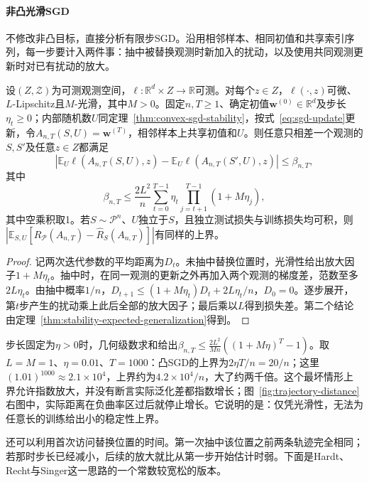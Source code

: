 \paragraph{非凸光滑SGD}

不修改非凸目标，直接分析有限步SGD。沿用相邻样本、相同初值和共享索引序列，每一步要计入两件事：抽中被替换观测时新加入的扰动，以及使用共同观测更新时对已有扰动的放大。

\begin{theorem}[非凸SGD的扰动传播]
\label{thm:nonconvex-sgd-product}
设$(Z,\mathcal Z)$为可测观测空间，$\ell:\mathbb R^d\times Z\to\mathbb R$可测。对每个$z\in Z$，$\ell(\cdot,z)$可微、$L$-Lipschitz且$M$-光滑，其中$M>0$。固定$n,T\geq1$、确定初值$\bm w^{(0)}\in\mathbb R^d$及步长$\eta_t\geq0$；内部随机数$U$同定理~\ref{thm:convex-sgd-stability}，按式~\eqref{eq:sgd-update}更新，令$A_{n,T}(S,U)=\bm w^{(T)}$，相邻样本上共享初值和$U$。则任意只相差一个观测的$S,S'$及任意$z\in Z$都满足
\[
 \left|\mathbb E_U\ell(A_{n,T}(S,U),z)
 -\mathbb E_U\ell(A_{n,T}(S',U),z)\right|\leq\beta_{n,T},
\]
其中
\[
 \beta_{n,T}\leq\frac{2L^2}{n}
 \sum_{t=0}^{T-1}\eta_t\prod_{j=t+1}^{T-1}(1+M\eta_j),
\]
其中空乘积取1。若$S\sim\mathcal P^n$、$U$独立于$S$，且独立测试损失与训练损失均可积，则$|\mathbb E_{S,U}[R_{\mathcal P}(A_{n,T})-\hat R_S(A_{n,T})]|$有同样的上界。
\end{theorem}
\begin{proof}
记两次迭代参数的平均距离为$D_t$。未抽中替换位置时，光滑性给出放大因子$1+M\eta_t$。抽中时，在同一观测的更新之外再加入两个观测的梯度差，范数至多$2L\eta_t$。由抽中概率$1/n$，$D_{t+1}\leq(1+M\eta_t)D_t+2L\eta_t/n$，$D_0=0$。逐步展开，第$t$步产生的扰动乘上此后全部的放大因子；最后乘以$L$得到损失差。第二个结论由定理~\ref{thm:stability-expected-generalization}得到。
\end{proof}

步长固定为$\eta>0$时，几何级数求和给出$\beta_{n,T}\leq\frac{2L^2}{Mn}((1+M\eta)^T-1)$。取$L=M=1$、$\eta=0.01$、$T=1000$：凸SGD的上界为$2\eta T/n=20/n$；这里$(1.01)^{1000}\approx2.1\times10^4$，上界约为$4.2\times10^4/n$，大了约两千倍。这个最坏情形上界允许指数放大，并没有断言实际泛化差都指数增长；图~\ref{fig:trajectory-distance}右图中，实际距离在负曲率区过后就停止增长。它说明的是：仅凭光滑性，无法为任意长的训练给出小的稳定性上界。

还可以利用首次访问替换位置的时间。第一次抽中该位置之前两条轨迹完全相同；若那时步长已经减小，后续的放大就比从第一步开始估计时弱。下面是Hardt、Recht与Singer这一思路的一个常数较宽松的版本。

